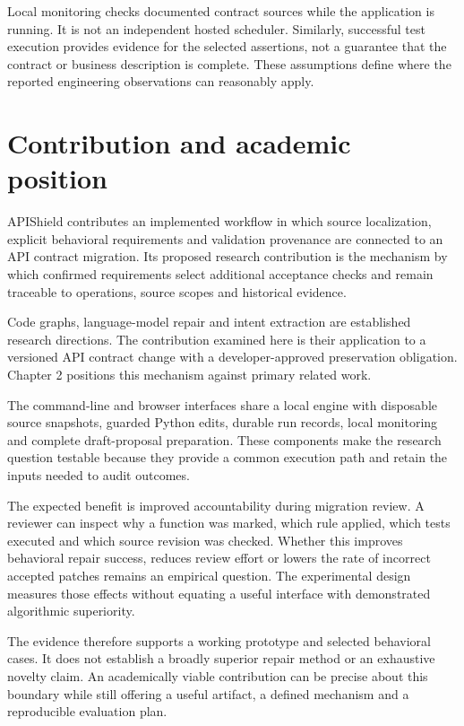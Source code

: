 \documentclass[12pt,a4paper,oneside]{report}
\begin{document}
Local monitoring checks documented contract sources while the application is running. It is not an independent hosted scheduler. Similarly, successful test execution provides evidence for the selected assertions, not a guarantee that the contract or business description is complete. These assumptions define where the reported engineering observations can reasonably apply.

\section{Contribution and academic position}

APIShield contributes an implemented workflow in which source localization, explicit behavioral requirements and validation provenance are connected to an API contract migration. Its proposed research contribution is the mechanism by which confirmed requirements select additional acceptance checks and remain traceable to operations, source scopes and historical evidence.

Code graphs, language-model repair and intent extraction are established research directions. The contribution examined here is their application to a versioned API contract change with a developer-approved preservation obligation. Chapter 2 positions this mechanism against primary related work.

The command-line and browser interfaces share a local engine with disposable source snapshots, guarded Python edits, durable run records, local monitoring and complete draft-proposal preparation. These components make the research question testable because they provide a common execution path and retain the inputs needed to audit outcomes.

The expected benefit is improved accountability during migration review. A reviewer can inspect why a function was marked, which rule applied, which tests executed and which source revision was checked. Whether this improves behavioral repair success, reduces review effort or lowers the rate of incorrect accepted patches remains an empirical question. The experimental design measures those effects without equating a useful interface with demonstrated algorithmic superiority.

The evidence therefore supports a working prototype and selected behavioral cases. It does not establish a broadly superior repair method or an exhaustive novelty claim. An academically viable contribution can be precise about this boundary while still offering a useful artifact, a defined mechanism and a reproducible evaluation plan.
\end{document}
